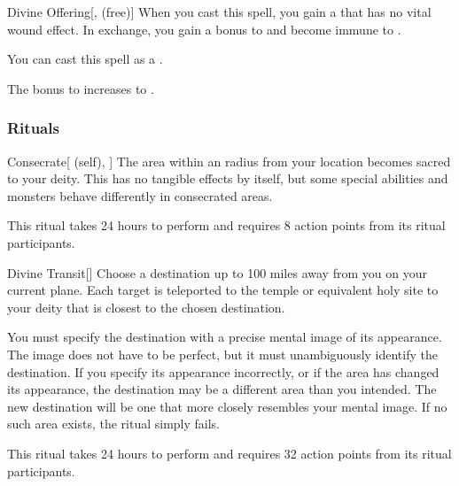 \lowercase{\hypertarget{spell:Divine Offering}{}}\label{spell:Divine Offering}
\begin{freeability}[Rank 6]{\hypertarget{spell:Divine Offering}{Divine Offering}}[,  (free)]
When you cast this spell, you gain a  that has no vital wound effect.
In exchange, you gain a  bonus to  and become immune to .

You can cast this spell as a .

\rankline
{} The bonus to  increases to .
\end{freeability}
\vspace{0.25em}



\subsubsection{Rituals}


\lowercase{\hypertarget{spell:Consecrate}{}}\label{spell:Consecrate}
\begin{attuneability}[Rank 3]{\hypertarget{spell:Consecrate}{Consecrate}}[ (self), ]
\targetrule
The area within an \arealarge radius  from your location becomes sacred to your deity.
This has no tangible effects by itself, but some special abilities and monsters behave differently in consecrated areas.

This ritual takes 24 hours to perform and requires 8 action points from its ritual participants.
\end{attuneability}
\vspace{0.25em}



\lowercase{\hypertarget{spell:Divine Transit}{}}\label{spell:Divine Transit}
\begin{apability}[Rank 5]{\hypertarget{spell:Divine Transit}{Divine Transit}}[]
Choose a destination up to 100 miles away from you on your current plane.
Each target is teleported to the temple or equivalent holy site to your deity that is closest to the chosen destination.

You must specify the destination with a precise mental image of its appearance.
The image does not have to be perfect, but it must unambiguously identify the destination.
If you specify its appearance incorrectly, or if the area has changed its appearance, the destination may be a different area than you intended.
The new destination will be one that more closely resembles your mental image.
If no such area exists, the ritual simply fails.

This ritual takes 24 hours to perform and requires 32 action points from its ritual participants.
\end{apability}
\vspace{0.25em}


